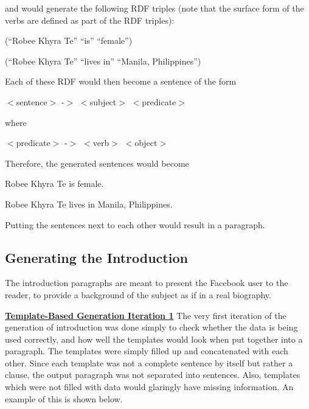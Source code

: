 and would generate the following RDF triples (note that the surface form of the verbs are defined as part of the RDF triples):

\begin{center} (``Robee Khyra Te'' ``is'' ``female'') \end{center}
\begin{center} (``Robee Khyra Te'' ``lives in'' ``Manila, Philippines'') \end{center}

Each of these RDF would then become a sentence of the form

\begin{center} $<$sentence$>$	-$>$	$<$subject$>$ $<$predicate$>$ \end{center}

where

\begin{center} $<$predicate$>$	-$>$	$<$verb$>$ $<$object$>$ \end{center}

Therefore, the generated sentences would become

\begin{center} Robee Khyra Te is female. \end{center}
\begin{center} Robee Khyra Te lives in Manila, Philippines. \end{center}

Putting the sentences next to each other would result in a paragraph. 

\subsection{Generating the Introduction}
The introduction paragraphs are meant to present the Facebook user to the reader, to provide a background of the subject as if in a real biography. 

\underline{\textbf{Template-Based Generation Iteration 1}} \newline
The very first iteration of the generation of introduction was done simply to check whether the data is being used correctly, and how well the templates would look when put together into a paragraph. The templates were simply filled up and concatenated with each other. Since each template was not a complete sentence by itself but rather a clause, the output paragraph was not separated into sentences. Also, templates which were not filled with data would glaringly have missing information. An example of this is shown below.

